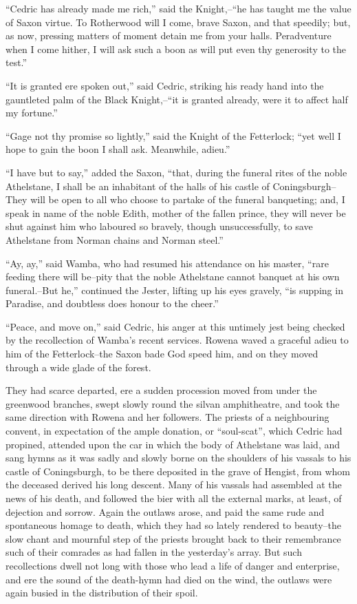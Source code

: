 ``Cedric has already made me rich,'' said the Knight,--``he has taught
me the value of Saxon virtue. To Rotherwood will I come, brave Saxon,
and that speedily; but, as now, pressing matters of moment detain me
from your halls. Peradventure when I come hither, I will ask such a boon
as will put even thy generosity to the test.''

``It is granted ere spoken out,'' said Cedric, striking his ready hand
into the gauntleted palm of the Black Knight,--``it is granted already,
were it to affect half my fortune.''

``Gage not thy promise so lightly,'' said the Knight of the Fetterlock;
``yet well I hope to gain the boon I shall ask. Meanwhile, adieu.''

``I have but to say,'' added the Saxon, ``that, during the funeral rites
of the noble Athelstane, I shall be an inhabitant of the halls of his
castle of Coningsburgh--They will be open to all who choose to partake
of the funeral banqueting; and, I speak in name of the noble Edith,
mother of the fallen prince, they will never be shut against him who
laboured so bravely, though unsuccessfully, to save Athelstane from
Norman chains and Norman steel.''

``Ay, ay,'' said Wamba, who had resumed his attendance on his master,
``rare feeding there will be--pity that the noble Athelstane cannot
banquet at his own funeral.--But he,'' continued the Jester, lifting up
his eyes gravely, ``is supping in Paradise, and doubtless does honour to
the cheer.''

``Peace, and move on,'' said Cedric, his anger at this untimely jest
being checked by the recollection of Wamba's recent services. Rowena
waved a graceful adieu to him of the Fetterlock--the Saxon bade God
speed him, and on they moved through a wide glade of the forest.

They had scarce departed, ere a sudden procession moved from under the
greenwood branches, swept slowly round the silvan amphitheatre, and took
the same direction with Rowena and her followers. The priests of a
neighbouring convent, in expectation of the ample donation, or
``soul-scat'', which Cedric had propined, attended upon the car in which
the body of Athelstane was laid, and sang hymns as it was sadly and
slowly borne on the shoulders of his vassals to his castle of
Coningsburgh, to be there deposited in the grave of Hengist, from whom
the deceased derived his long descent. Many of his vassals had assembled
at the news of his death, and followed the bier with all the external
marks, at least, of dejection and sorrow. Again the outlaws arose, and
paid the same rude and spontaneous homage to death, which they had so
lately rendered to beauty--the slow chant and mournful step of the
priests brought back to their remembrance such of their comrades as had
fallen in the yesterday's array. But such recollections dwell not long
with those who lead a life of danger and enterprise, and ere the sound
of the death-hymn had died on the wind, the outlaws were again busied in
the distribution of their spoil.

